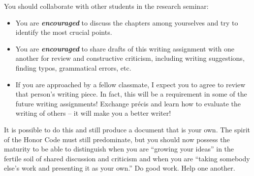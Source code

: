 You should collaborate with other students in the research seminar:
\begin{itemize}

\item You are \textit{\textbf{encouraged}} to discuss the chapters among
yourselves and try to identify the most crucial points.

\item You are  \textit{\textbf{encouraged}} to share
drafts of this writing assignment with one another for review
and constructive criticism, including writing suggestions, finding typos, grammatical errors, etc.

\item If you are approached by a fellow classmate, I expect you to agree to review that person's writing piece. 
In fact, this will be a requirement in some of the future writing assignments!
Exchange pr\'{e}cis and learn how to evaluate the writing of others -- it will make you a better writer!

\end{itemize}

It is possible to do this and still produce a document that is your own. The spirit of the Honor Code must still
predominate, but you should now possess the maturity to be able to distinguish when you are ``growing your ideas'' in
the fertile soil of shared discussion and criticism and when you are ``taking somebody else's work and presenting it as
your own.'' Do good work. Help one another.


